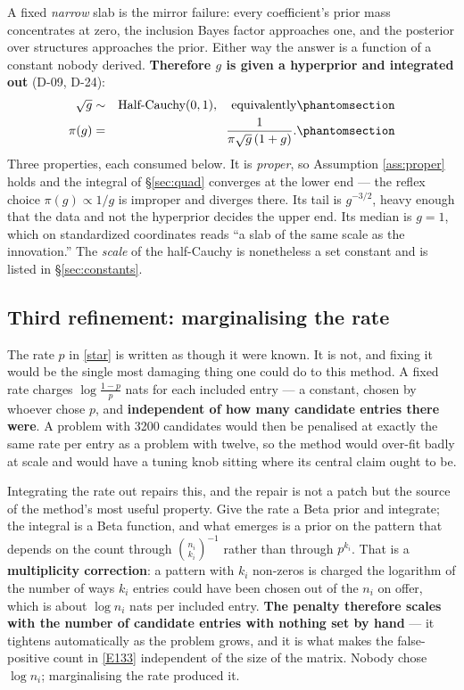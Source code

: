 A fixed \emph{narrow} slab is the mirror failure: every coefficient's prior mass
concentrates at zero, the inclusion Bayes factor approaches one, and the posterior
over structures approaches the prior. Either way the answer is a function of a
constant nobody derived. \textbf{Therefore $g$ is given a hyperprior and integrated
out} (D-09, D-24):
\begin{eqnarray}
\sqrt{g} &\sim& \text{Half-Cauchy}(0,1), \quad\text{equivalently}
  \Elabel{E-95A}{E95_A} \\
\pi(g) &=& \frac{1}{\pi\sqrt{g}\,(1+g)}.
  \Elabel{E-95B}{E95_B}
\end{eqnarray}
Three properties, each consumed below. It is \emph{proper}, so Assumption
\ref{ass:proper} holds and the integral of \S\ref{sec:quad} converges at the lower
end --- the reflex choice $\pi(g)\propto1/g$ is improper and diverges there. Its tail
is $g^{-3/2}$, heavy enough that the data and not the hyperprior decides the upper
end. Its median is $g=1$, which on standardized coordinates reads ``a slab of the
same scale as the innovation.'' The \emph{scale} of the half-Cauchy is nonetheless a
set constant and is listed in \S\ref{sec:constants}.

\subsection{Third refinement: marginalising the rate}\label{sec:rate}

The rate $p$ in \eqref{star} is written as though it were known. It is not, and
fixing it would be the single most damaging thing one could do to this method. A
fixed rate charges $\log\frac{1-p}{p}$ nats for each included entry --- a constant,
chosen by whoever chose $p$, and \textbf{independent of how many candidate entries
there were}. A problem with 3200 candidates would then be penalised at exactly the
same rate per entry as a problem with twelve, so the method would over-fit badly at
scale and would have a tuning knob sitting where its central claim ought to be.

Integrating the rate out repairs this, and the repair is not a patch but the source
of the method's most useful property. Give the rate a Beta prior and integrate; the
integral is a Beta function, and what emerges is a prior on the pattern that depends
on the count through $\binom{n_i}{k_i}^{-1}$ rather than through $p^{k_i}$. That is a
\textbf{multiplicity correction}: a pattern with $k_i$ non-zeros is charged the
logarithm of the number of ways $k_i$ entries could have been chosen out of the $n_i$
on offer, which is about $\log n_i$ nats per included entry. \textbf{The penalty
therefore scales with the number of candidate entries with nothing set by hand} ---
it tightens automatically as the problem grows, and it is what makes the
false-positive count in \eqref{E133} independent of the size of the matrix. Nobody
chose $\log n_i$; marginalising the rate produced it.


